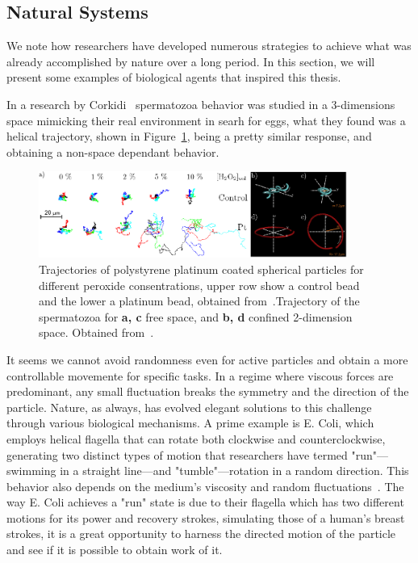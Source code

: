 \subsection{Natural Systems}

We note how researchers have developed numerous strategies to achieve what was already accomplished by nature over a long period. In this section, we will present some examples of biological agents that inspired this thesis.

 In a research by Corkidi~\cite{corkidi2008tracking} spermatozoa behavior was studied in a 3-dimensions space mimicking their real environment in searh for eggs, what they found was a helical trajectory, shown in Figure~\ref{fig:corkidiexperiment}, being a pretty similar response, and obtaining a non-space dependant behavior.

\begin{figure}[h]
  \begin{center}
    \includegraphics[width=0.90\textwidth]{figures/randomwalk.pdf}
  \end{center}
  \caption[Random Walk for active brownian particles.]{Trajectories of polystyrene platinum coated spherical particles for different peroxide consentrations, upper row show a control bead and the lower a platinum bead, obtained from~\cite{howse2007self}.Trajectory of the spermatozoa for \textbf{a, c} free space, and \textbf{b, d} confined 2-dimension space. Obtained from~\cite{corkidi2008tracking}.}\label{fig:corkidiexperiment}
\end{figure}



It seems we cannot avoid randomness even for active particles and obtain a more controllable movemente for specific tasks. In a regime where viscous forces are predominant, any small fluctuation breaks the symmetry and the direction of the particle. Nature, as always, has evolved elegant solutions to this challenge through various biological mechanisms. A prime example is E. Coli, which employs helical flagella that can rotate both clockwise and counterclockwise, generating two distinct types of motion that researchers have termed "run"—swimming in a straight line—and "tumble"—rotation in a random direction. This behavior also depends on the medium's viscosity and random fluctuations~\cite{kumar2010physics}. The way E. Coli achieves a "run" state is due to their flagella which has two different motions for its power and recovery strokes, simulating those of a human's breast strokes, it is a great opportunity to harness the directed motion of the particle and see if it is possible to obtain work of it. 


